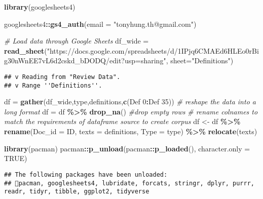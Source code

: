 \documentclass[
]{article}
\newenvironment{Shaded}{\begin{snugshade}}{\end{snugshade}}
\newcommand{\AttributeTok}[1]{\textcolor[rgb]{0.13,0.29,0.53}{#1}}
\newcommand{\CommentTok}[1]{\textcolor[rgb]{0.56,0.35,0.01}{\textit{#1}}}
\newcommand{\ConstantTok}[1]{\textcolor[rgb]{0.56,0.35,0.01}{#1}}
\newcommand{\FunctionTok}[1]{\textcolor[rgb]{0.13,0.29,0.53}{\textbf{#1}}}
\newcommand{\NormalTok}[1]{#1}
\newcommand{\OtherTok}[1]{\textcolor[rgb]{0.56,0.35,0.01}{#1}}
\newcommand{\SpecialCharTok}[1]{\textcolor[rgb]{0.81,0.36,0.00}{\textbf{#1}}}
\newcommand{\StringTok}[1]{\textcolor[rgb]{0.31,0.60,0.02}{#1}}
\begin{document}
\begin{Shaded}
\begin{Highlighting}[]
\FunctionTok{library}\NormalTok{(googlesheets4)}

\NormalTok{googlesheets4}\SpecialCharTok{::}\FunctionTok{gs4\_auth}\NormalTok{(}\AttributeTok{email =} \StringTok{"tonyhung.th@gmail.com"}\NormalTok{)}

\CommentTok{\# Load data through Google Sheets}
\NormalTok{df\_wide }\OtherTok{=} \FunctionTok{read\_sheet}\NormalTok{(}\StringTok{"https://docs.google.com/spreadsheets/d/1IPjq6CMAEd6HLEo0rBig30nWnEE7vL6d2cskd\_bDODQ/edit?usp=sharing"}\NormalTok{, }\AttributeTok{sheet=}\StringTok{"Definitions"}\NormalTok{)}
\end{Highlighting}
\end{Shaded}

\begin{verbatim}
## v Reading from "Review Data".
## v Range ''Definitions''.
\end{verbatim}

\begin{Shaded}
\begin{Highlighting}[]
\NormalTok{df }\OtherTok{=} \FunctionTok{gather}\NormalTok{(df\_wide,type,definitions,}\FunctionTok{c}\NormalTok{(}\StringTok{\textasciigrave{}}\AttributeTok{Def 0}\StringTok{\textasciigrave{}}\SpecialCharTok{:}\StringTok{\textasciigrave{}}\AttributeTok{Def 35}\StringTok{\textasciigrave{}}\NormalTok{)) }\CommentTok{\# reshape the data into a long format}
\NormalTok{df }\OtherTok{=}\NormalTok{ df }\SpecialCharTok{\%\textgreater{}\%} \FunctionTok{drop\_na}\NormalTok{() }\CommentTok{\#drop empty rows}
\CommentTok{\# rename colnames to match the requirements of dataframe source to create corpus}
\NormalTok{df }\OtherTok{\textless{}{-}}\NormalTok{ df }\SpecialCharTok{\%\textgreater{}\%} \FunctionTok{rename}\NormalTok{(}\AttributeTok{Doc\_id =}\NormalTok{ ID, }\AttributeTok{texts =}\NormalTok{ definitions, }\AttributeTok{Type =}\NormalTok{ type) }\SpecialCharTok{\%\textgreater{}\%} \FunctionTok{relocate}\NormalTok{(texts)}

\FunctionTok{library}\NormalTok{(pacman)}
\NormalTok{pacman}\SpecialCharTok{::}\FunctionTok{p\_unload}\NormalTok{(pacman}\SpecialCharTok{::}\FunctionTok{p\_loaded}\NormalTok{(), }\AttributeTok{character.only =} \ConstantTok{TRUE}\NormalTok{)}
\end{Highlighting}
\end{Shaded}

\begin{verbatim}
## The following packages have been unloaded:
## pacman, googlesheets4, lubridate, forcats, stringr, dplyr, purrr, readr, tidyr, tibble, ggplot2, tidyverse
\end{verbatim}
\end{document}
